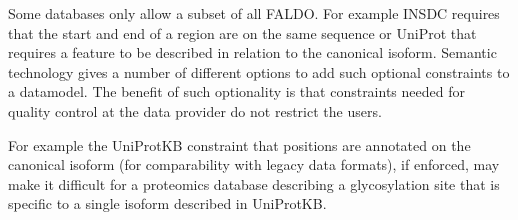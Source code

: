 Some databases only allow a subset of all FALDO. For example
INSDC requires that the start and end of a region are on the same sequence 
or UniProt that requires a feature to be described in relation to the canonical isoform.
Semantic technology gives a number of different options\cite{RDFValidationReport} to add 
such optional constraints to a datamodel. 
The benefit of such optionality is that constraints needed for quality control at 
the data provider do not restrict the users. 

For example the UniProtKB constraint that positions are annotated on the canonical isoform 
(for comparability with legacy data formats), if enforced, may make it difficult for a proteomics
database describing a glycosylation site that is specific to a single isoform described in UniProtKB.




